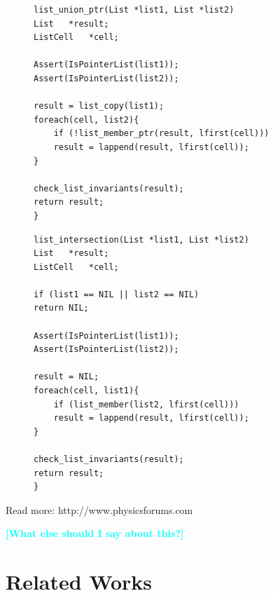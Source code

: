 \documentclass{sig-alternate}
\newcommand{\todo}[1]{\textcolor{cyan}{\textbf{[#1]}}}
\begin{document}
\begin{figure}
\noindent
\begin{minipage}{270pt}

\begin{lstlisting}[label=lst:cloneexample1, caption=Clone Example \#1]
list_union_ptr(List *list1, List *list2)
List   *result;
ListCell   *cell;

Assert(IsPointerList(list1));
Assert(IsPointerList(list2));

result = list_copy(list1);
foreach(cell, list2){
    if (!list_member_ptr(result, lfirst(cell)))
    result = lappend(result, lfirst(cell));
}

check_list_invariants(result);
return result;
}

\end{lstlisting}


\end{minipage}%
\begin{minipage}{.5\textwidth}
  \begin{lstlisting}[label=lst:cloneexample2, caption=Clone Example \#2]
list_intersection(List *list1, List *list2)
List   *result;
ListCell   *cell;

if (list1 == NIL || list2 == NIL)
return NIL;

Assert(IsPointerList(list1));
Assert(IsPointerList(list2));

result = NIL;
foreach(cell, list1){
    if (list_member(list2, lfirst(cell)))
    result = lappend(result, lfirst(cell));
}

check_list_invariants(result);
return result;
}

\end{lstlisting}

\end{minipage}
\end{figure}

Read more: http://www.physicsforums.com 

\todo{What else should I say about this?}


%

\section{Related Works}
\label{sec: relatedworks}
\end{document}
